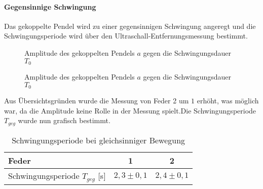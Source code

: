 \paragraph{Gegensinnige Schwingung}
Das gekoppelte Pendel wird zu einer gegensinnigen Schwingung angeregt und die Schwingungsperiode wird über den Ultraschall-Entfernungsmessung bestimmt.
\begin{figure}[H]
  \centering
  \caption{Amplitude des gekoppelten Pendels $a$ gegen die Schwingungsdauer $T_0$ }
  \label{fig:gegenschwingung}
\end{figure}
\begin{figure}[H]
  \centering
  \caption{Amplitude des gekoppelten Pendels $a$ gegen die Schwingungsdauer $T_0$ }
  \label{fig:ausschnittgegen}
\end{figure}
Aus Übersichtsgründen wurde die Messung von Feder 2 um $1$ erhöht, was möglich war, da die Amplitude keine Rolle in der Messung spielt.Die Schwingungsperiode $T_{geg}$ wurde nun grafisch bestimmt.
\begin{table}[H]
  \centering
  \begin{tabular}{l | c | c }
    Feder & 1 & 2\\ \hline
    Schwingungsperiode $T_{geg}$ [s]& $2,3\pm 0,1$ & $2,4 \pm 0,1$
    
  \end{tabular}
  \caption{Schwingungsperiode bei gleichsinniger Bewegung}
  \label{tab:tgegen}
\end{table}
